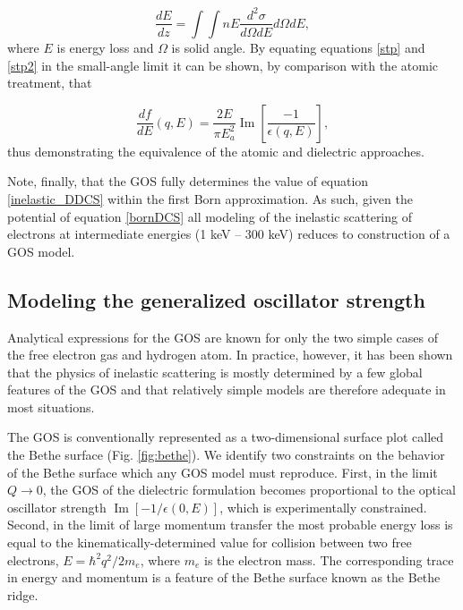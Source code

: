 \documentclass [11pt, proquest, article] {uwthesis}[2016/11/22]
\begin{document}
\begin{equation} \label{stp2}
\frac{dE}{dz} = \int \int n E \frac{d^2\sigma}{d\Omega dE} d\Omega dE,
\end{equation}
where $E$ is energy loss and $\Omega$ is solid angle. By equating equations \ref{stp} and \ref{stp2} in the small-angle limit it can be shown, by comparison with the atomic treatment, that 

$$
\frac{df}{dE}(q, E) = \frac{2E}{\pi E_a^2} \operatorname{Im}[\frac{-1}{\epsilon(q, E)}],
$$
thus demonstrating the equivalence of the atomic and dielectric approaches.

Note, finally, that the GOS fully determines the value of equation \ref{inelastic_DDCS} within the first Born approximation. As such, given the potential of equation \ref{bornDCS} all modeling of the inelastic scattering of electrons at intermediate energies (1 keV -- 300 keV) reduces to construction of a GOS model. 




\subsection{Modeling the generalized oscillator strength}
Analytical expressions for the GOS are known for only the two simple cases of the free electron gas and hydrogen atom. In practice, however, it has been shown that the physics of inelastic scattering is mostly determined by a few global features of the GOS and that relatively simple models are therefore adequate in most situations.\cite{salvat1992semiempirical}


The GOS is conventionally represented as a two-dimensional surface plot called the Bethe surface (Fig. \ref{fig:bethe}). 
We identify two constraints on the behavior of the Bethe surface which any GOS model must reproduce. First, in the limit $Q\rightarrow 0$, the GOS of the dielectric formulation becomes proportional to  the optical oscillator strength $\operatorname{Im}[-1/\epsilon(0, E)]$, which is experimentally constrained. Second, in the limit of large momentum transfer the most probable energy loss is equal to the kinematically-determined value for collision between two free electrons, $E = \hbar^2q^2/2 m_e$, where $m_e$ is the electron mass.\cite{sorini2006ab} The corresponding trace in energy and momentum is a feature of the Bethe surface known as the Bethe ridge.
\end{document}

